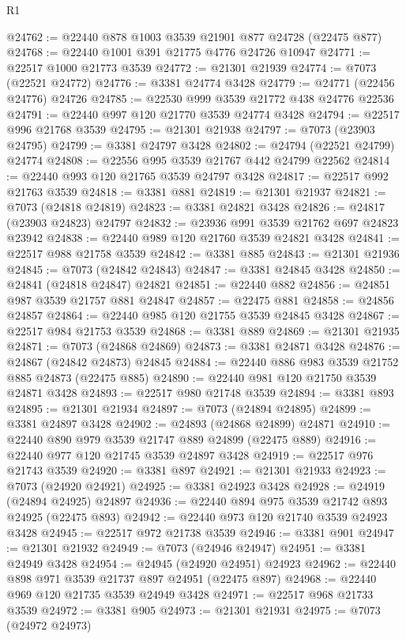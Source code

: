 \begin{lexlean}{R1}
\begin{coremodule}
@24762 := @22440 @878 @1003 @3539 @21901 @877 @24728 (@22475 @877)
@24768 := @22440 @1001 @391 @21775 @4776 @24726 @10947
@24771 := @22517 @1000 @21773 @3539
@24772 := @21301 @21939
@24774 := @7073 (@22521 @24772)
@24776 := @3381 @24774 @3428
@24779 := @24771 (@22456 @24776) @24726
@24785 := @22530 @999 @3539 @21772 @438 @24776 @22536
@24791 := @22440 @997 @120 @21770 @3539 @24774 @3428
@24794 := @22517 @996 @21768 @3539
@24795 := @21301 @21938
@24797 := @7073 (@23903 @24795)
@24799 := @3381 @24797 @3428
@24802 := @24794 (@22521 @24799) @24774
@24808 := @22556 @995 @3539 @21767 @442 @24799 @22562
@24814 := @22440 @993 @120 @21765 @3539 @24797 @3428
@24817 := @22517 @992 @21763 @3539
@24818 := @3381 @881
@24819 := @21301 @21937
@24821 := @7073 (@24818 @24819)
@24823 := @3381 @24821 @3428
@24826 := @24817 (@23903 @24823) @24797
@24832 := @23936 @991 @3539 @21762 @697 @24823 @23942
@24838 := @22440 @989 @120 @21760 @3539 @24821 @3428
@24841 := @22517 @988 @21758 @3539
@24842 := @3381 @885
@24843 := @21301 @21936
@24845 := @7073 (@24842 @24843)
@24847 := @3381 @24845 @3428
@24850 := @24841 (@24818 @24847) @24821
@24851 := @22440 @882
@24856 := @24851 @987 @3539 @21757 @881 @24847
@24857 := @22475 @881
@24858 := @24856 @24857
@24864 := @22440 @985 @120 @21755 @3539 @24845 @3428
@24867 := @22517 @984 @21753 @3539
@24868 := @3381 @889
@24869 := @21301 @21935
@24871 := @7073 (@24868 @24869)
@24873 := @3381 @24871 @3428
@24876 := @24867 (@24842 @24873) @24845
@24884 := @22440 @886 @983 @3539 @21752 @885 @24873 (@22475 @885)
@24890 := @22440 @981 @120 @21750 @3539 @24871 @3428
@24893 := @22517 @980 @21748 @3539
@24894 := @3381 @893
@24895 := @21301 @21934
@24897 := @7073 (@24894 @24895)
@24899 := @3381 @24897 @3428
@24902 := @24893 (@24868 @24899) @24871
@24910 := @22440 @890 @979 @3539 @21747 @889 @24899 (@22475 @889)
@24916 := @22440 @977 @120 @21745 @3539 @24897 @3428
@24919 := @22517 @976 @21743 @3539
@24920 := @3381 @897
@24921 := @21301 @21933
@24923 := @7073 (@24920 @24921)
@24925 := @3381 @24923 @3428
@24928 := @24919 (@24894 @24925) @24897
@24936 := @22440 @894 @975 @3539 @21742 @893 @24925 (@22475 @893)
@24942 := @22440 @973 @120 @21740 @3539 @24923 @3428
@24945 := @22517 @972 @21738 @3539
@24946 := @3381 @901
@24947 := @21301 @21932
@24949 := @7073 (@24946 @24947)
@24951 := @3381 @24949 @3428
@24954 := @24945 (@24920 @24951) @24923
@24962 := @22440 @898 @971 @3539 @21737 @897 @24951 (@22475 @897)
@24968 := @22440 @969 @120 @21735 @3539 @24949 @3428
@24971 := @22517 @968 @21733 @3539
@24972 := @3381 @905
@24973 := @21301 @21931
@24975 := @7073 (@24972 @24973)

\end{coremodule}
\end{lexlean}
